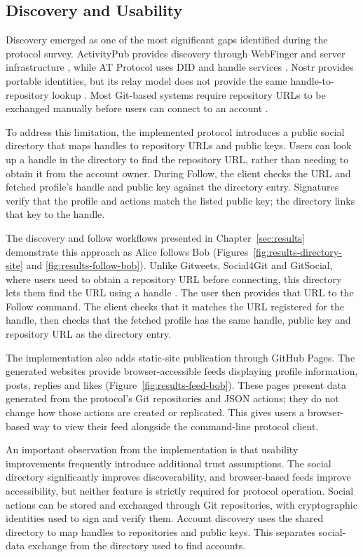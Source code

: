 \subsection{Discovery and Usability}

Discovery emerged as one of the most significant gaps identified during
the protocol survey. ActivityPub provides discovery through WebFinger and
server infrastructure \cite{w3cActivityPub2018}, while AT Protocol uses
DID and handle services \cite{atproto2026}. Nostr provides portable
identities, but its relay model does not provide the same handle-to-repository
lookup \cite{fiatjaf2026}. Most Git-based systems require repository URLs
to be exchanged manually before users can connect to an account
\cite{gitweets2026,social4git2026,gitsocial2026}.

To address this limitation, the implemented protocol introduces a public
social directory that maps handles to repository URLs and public keys.
Users can look up a handle in the directory to find the repository URL,
rather than needing to obtain it from the account owner. During Follow, the
client checks the URL and fetched profile's handle and public key against
the directory entry. Signatures verify that the profile and actions match
the listed public key; the directory links that key to the handle.

The discovery and follow workflows presented in
Chapter~\ref{sec:results} demonstrate this approach as Alice follows Bob
(Figures~\ref{fig:results-directory-site} and
\ref{fig:results-follow-bob}). Unlike Gitweets, Social4Git and GitSocial,
where users need to obtain a repository URL before connecting, this
directory lets them find the URL using a handle
\cite{gitweets2026,social4git2026,gitsocial2026}. The user then provides
that URL to the Follow command. The client checks that it matches the URL
registered for the handle, then checks that the fetched profile has the
same handle, public key and repository URL as the directory entry.

The implementation also adds static-site publication through GitHub
Pages. The generated websites provide browser-accessible feeds displaying
profile information, posts, replies and likes (Figure~\ref{fig:results-feed-bob}).
These pages present data generated from the protocol's Git repositories and
JSON actions; they do not change how those actions are created or replicated.
This gives users a browser-based way to view their feed alongside the
command-line protocol client.

An important observation from the implementation is that usability
improvements frequently introduce additional trust assumptions. The
social directory significantly improves discoverability, and
browser-based feeds improve accessibility, but neither feature is
strictly required for protocol operation. Social actions can be stored and
exchanged through Git repositories, with cryptographic identities used to
sign and verify them. Account discovery uses the shared directory to map
handles to repositories and public keys. This separates social-data
exchange from the directory used to find accounts.

